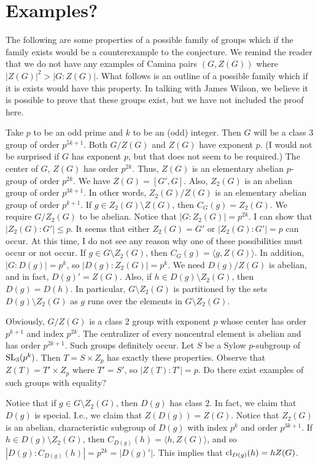 \section{Examples?}

The following are some properties of a possible family of groups which if the family exists would be a counterexample to the conjecture.  We remind the reader that we do not have any examples of Camina pairs $(G,Z(G))$ where $|Z(G)|^2 > |G:Z(G)|$.  What follows is an outline of a possible family which if it is exists would have this property.  In talking with James Wilson, we believe it is possible to prove that these groups exist, but we have not included the proof here.

Take $p$ to be an odd prime and $k$ to be an (odd) integer.  Then $G$ will be a class 3 group of order $p^{5k+1}$.  Both $G/Z(G)$ and $Z(G)$ have exponent $p$.  (I would not be surprised if $G$ has exponent $p$, but that does not seem to be required.)  The center of $G$, $Z(G)$ has order $p^{2k}$.  Thus, $Z (G)$ is an elementary abelian $p$-group of order $p^{2k}$.  We have $Z(G) = [G',G]$.  Also, $Z_2 (G)$ is an abelian group of order $p^{3k+1}$.  In other words, $Z_2 (G)/ Z (G)$ is an elementary abelian group of order $p^{k+1}$.  If $g \in Z_2 (G) \setminus Z(G)$, then $C_G (g) = Z_2 (G)$.  We require $G/Z_2 (G)$ to be abelian.  Notice that $|G:Z_2 (G)| = p^{2k}$.  I can show that $|Z_2 (G):G'| \le p$.  It seems that either $Z_2 (G) = G'$ or $|Z_2 (G):G'| = p$ can occur.  At this time, I do not see any reason why one of these possibilities must occur or not occur. If $g \in G \setminus Z_2 (G)$, then $C_G (g) = \langle g, Z(G) \rangle$.  In addition, $|G:D(g)| = p^k$, so $|D(g):Z_2 (G)| = p^k$.  We need $D (g)/ Z(G)$ is abelian, and in fact, $D (g)' = Z(G)$.  Also, if $h \in D (g) \setminus Z_2 (G)$, then $D (g) = D (h)$.  In particular, $G \setminus Z_2 (G)$ is partitioned by the sets $D (g) \setminus Z_2 (G)$ as $g$ runs over the elements in $G \setminus Z_2 (G)$.

Obviously, $G/ Z(G)$ is a class $2$ group with exponent $p$ whose center has order $p^{k+1}$ and index $p^{2k}$.  The centralizer of every noncentral element is abelian and has order $p^{2k+1}$.  Such groups definitely occur.  Let $S$ be a Sylow $p$-subgroup of ${\rm SL}_3 (p^k)$.  Then $T = S \times Z_p$ has exactly these properties.  Observe that $Z(T) = T' \times Z_p$ where $T' = S'$, so $|Z(T):T'| = p$.  Do there exist examples of such groups with equality?

Notice that if $g \in G \setminus Z_2 (G)$, then $D (g)$ has class $2$.  In fact, we claim that $D (g)$ is special.  I.e., we claim that $Z (D(g)) = Z (G)$.  Notice that $Z_2 (G)$ is an abelian, characteristic subgroup of $D (g)$ with index $p^k$ and order $p^{3k + 1}$.  If $h \in D(g) \setminus Z_2 (G)$, then $C_{D (g)} (h) = \langle h, Z (G) \rangle$, and so $|D (g): C_{D (g)} (h)| = p^{2k} = |D (g)'|$.  This implies that ${\rm cl}_{D(g)} (h) = h Z (G)$.

